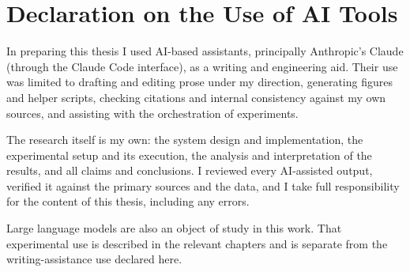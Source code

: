 \section*{Declaration on the Use of AI Tools}

In preparing this thesis I used AI-based assistants, principally Anthropic's Claude (through the Claude Code interface), as a writing and engineering aid. Their use was limited to drafting and editing prose under my direction, generating figures and helper scripts, checking citations and internal consistency against my own sources, and assisting with the orchestration of experiments.

The research itself is my own: the system design and implementation, the experimental setup and its execution, the analysis and interpretation of the results, and all claims and conclusions. I reviewed every AI-assisted output, verified it against the primary sources and the data, and I take full responsibility for the content of this thesis, including any errors.

Large language models are also an object of study in this work. That experimental use is described in the relevant chapters and is separate from the writing-assistance use declared here.

{}

\newpage
